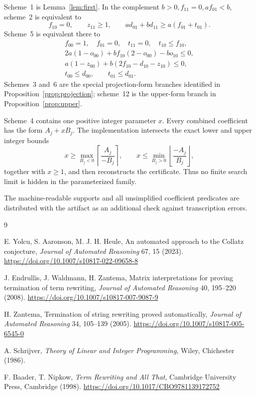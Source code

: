 \documentclass[11pt]{article}
\theoremstyle{definition}
\begin{document}
Scheme~1 is Lemma~\ref{lem:first}.  In the complement
$b>0,f_{11}=0,af_{01}<b$, scheme~2 is equivalent to
\[
 f_{10}=0,\qquad z_{11}\ge1,\qquad
 ad_{01}+bd_{11}\ge a(f_{01}+t_{01}).
\]
Scheme~5 is equivalent there to
\begin{gather*}
 f_{00}=1,\quad f_{01}=0,\quad t_{11}=0,\quad t_{10}\le f_{10},\\
 2a(1-o_{00})+bf_{10}(2-o_{00})-bo_{10}\le0,\\
 a(1-z_{00})+b(2f_{10}-d_{10}-z_{10})\le0,\\
 t_{00}\le d_{00},\qquad t_{01}\le d_{01}.
\end{gather*}
Schemes~3 and~6 are the special projection-form branches identified in
Proposition~\ref{prop:projection}; scheme~12 is the upper-form branch in
Proposition~\ref{prop:upper}.

Scheme~4 contains one positive integer parameter $x$.  Every combined
coefficient has the form $A_j+xB_j$.  The implementation intersects the
exact lower and upper integer bounds
\[
 x\ge\max_{B_j<0}\left\lceil\frac{A_j}{-B_j}\right\rceil,
 \qquad
 x\le\min_{B_j>0}\left\lfloor\frac{-A_j}{B_j}\right\rfloor,
\]
together with $x\ge1$, and then reconstructs the certificate.  Thus no
finite search limit is hidden in the parameterized family.

The machine-readable supports and all unsimplified coefficient predicates
are distributed with the artifact as an additional check against transcription
errors.

\begin{thebibliography}{9}

E. Yolcu, S. Aaronson, M. J. H. Heule,
An automated approach to the Collatz conjecture,
\emph{Journal of Automated Reasoning} 67, 15 (2023).
\url{https://doi.org/10.1007/s10817-022-09658-8}

J. Endrullis, J. Waldmann, H. Zantema,
Matrix interpretations for proving termination of term rewriting,
\emph{Journal of Automated Reasoning} 40, 195--220 (2008).
\url{https://doi.org/10.1007/s10817-007-9087-9}

H. Zantema,
Termination of string rewriting proved automatically,
\emph{Journal of Automated Reasoning} 34, 105--139 (2005).
\url{https://doi.org/10.1007/s10817-005-6545-0}

A. Schrijver,
\emph{Theory of Linear and Integer Programming},
Wiley, Chichester (1986).

F. Baader, T. Nipkow,
\emph{Term Rewriting and All That},
Cambridge University Press, Cambridge (1998).
\url{https://doi.org/10.1017/CBO9781139172752}

\end{thebibliography}
\end{document}
